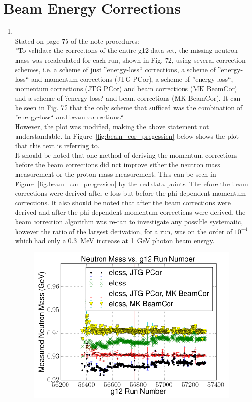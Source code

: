 \documentclass[10pt,a4paper]{article}
\begin{document}
	\section{Beam Energy Corrections}
\begin{enumerate}
	\item
	\\
	Stated on page 75 of the note procedures:\\
	''To validate the corrections of the entire g12 data set, the missing neutron mass was recalculated for each run, shown in Fig. 72, using several correction schemes, i.e. a scheme of just ''energy-loss`` corrections, a scheme of ''energy-loss`` and momentum corrections (JTG PCor), a scheme of ''energy-loss``, momentum corrections (JTG PCor) and beam corrections (MK BeamCor) and a scheme of ?energy-loss? and beam corrections (MK BeamCor). It can be seen in Fig. 72 that the only scheme that sufficed was the combination of ''energy-loss`` and beam corrections.``\\ However, the plot was modified, making the above statement not understandable. In Figure~\ref{fig:beam_cor_progession} below shows the plot that this text is referring to. \\
	It should be noted that one method of deriving the momentum corrections before the beam corrections did not improve either the neutron mass measurement or the proton mass measurement. This can be seen in Figure~\ref{fig:beam_cor_progession} by the red data points. Therefore the beam corrections were derived after e-loss but before the phi-dependent momentum corrections. It also should be noted that after the beam corrections were derived and after the phi-dependent momentum corrections were derived, the beam correction algorithm was re-ran to investigate any possible systematic, however the ratio of the largest derivation, for a run, was on the order of $10^{-4}$ which had only a 0.3~MeV increase at 1~GeV photon beam energy.
	 	\begin{figure}[h!]\begin{center}
	 			\includegraphics[width=200 pt, height=200 pt]{C3pi_allcorr_neutron_rxr.png}

\end{center}
\end{figure}
\end{enumerate}
\end{document}
